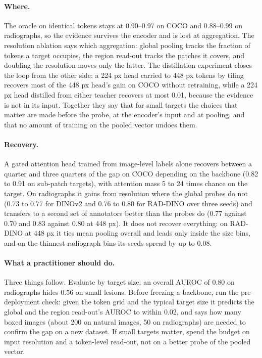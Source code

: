 \documentclass[10pt,letterpaper,twocolumn]{article}
\begin{document}
\paragraph{Where.}
The oracle on identical tokens stays at 0.90--0.97 on COCO and 0.88--0.99 on radiographs, so
the evidence survives the encoder and is lost at aggregation. The resolution ablation says
which aggregation: global pooling tracks the fraction of tokens a target occupies, the region
read-out tracks the patches it covers, and doubling the resolution moves only the latter. The
distillation experiment closes the loop from the other side: a 224 px head carried to 448 px
tokens by tiling recovers most of the 448 px head's gain on COCO without retraining, while a
224 px head distilled from either teacher recovers at most 0.01, because the evidence is not
in its input. Together they say that for
small targets the choices that matter are made before the probe, at the encoder's input and
at pooling, and that no amount of training on the pooled vector undoes them.

\paragraph{Recovery.}
A gated attention head trained from image-level labels alone recovers between a quarter and
three quarters of the gap on COCO depending on the backbone (0.82 to 0.91 on sub-patch
targets), with attention mass 5 to 24 times chance on the target. On radiographs it gains
from resolution where the global probes do not (0.73 to 0.77 for DINOv2 and 0.76 to 0.80 for
RAD-DINO over three seeds) and transfers to a second set of annotators better than the probes
do (0.77 against 0.70 and 0.83 against 0.80 at 448 px). It does not recover everything: on
RAD-DINO at 448 px it ties mean pooling overall and leads only inside the size bins, and on
the thinnest radiograph bins its seeds spread by up to 0.08.

\paragraph{What a practitioner should do.}
Three things follow. Evaluate by target size: an overall AUROC of 0.80 on radiographs hides
0.56 on small lesions. Before freezing a backbone, run the pre-deployment check: given the
token grid and the typical target size it predicts the global and the region read-out's
AUROC to within 0.02, and says how many boxed images (about 200 on natural images, 50 on
radiographs) are needed to confirm the gap on a new dataset. If small targets matter, spend
the budget on input resolution and a token-level read-out, not on a better probe of the
pooled vector.
\end{document}
